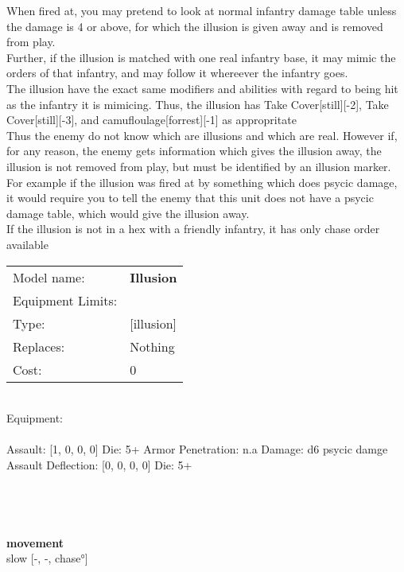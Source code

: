 \noindent When fired at, you may pretend to look at normal infantry damage table unless the damage is 4 or above, for which the illusion is given away and is removed from play.\\ 
Further, if the illusion is matched with one real infantry base, it may mimic the orders of that infantry, and may follow it whereever the infantry goes.\\ 
The illusion have the exact same modifiers and abilities with regard to being hit as the infantry it is mimicing. Thus, the illusion has Take Cover[still][-2], Take Cover[still][-3], and camufloulage[forrest][-1] as appropritate \\ 
 Thus the enemy do not know which are illusions and which are real. However if, for any reason, the enemy gets information which gives the illusion away, the illusion is not removed from play, but must be identified by an illusion marker. For example if the illusion was fired at by something which does psycic damage, it would require you to tell the enemy that this unit does not have a psycic damage table, which would give the illusion away.\\ 
If the illusion is not in a hex with a friendly infantry, it has only chase order available\\ 


\noindent
\begin{tabular}{ll}
Model name: &{\bf Illusion } \\
Equipment Limits: & \\
Type: &[illusion] \\
Replaces: &Nothing \\
Cost: & 0\\
\end{tabular}
\ \\
Equipment:  \\
\ \\
Assault: [1, 0, 0, 0] Die: 5+ Armor Penetration: n.a Damage: d6 psycic damge \\
Assault Deflection: [0, 0, 0, 0] Die: 5+\\
\indent  
\ \\

\ \\
 
\ \\



\ \\ {\bf movement } \\
slow [-, -, chase°] \\


